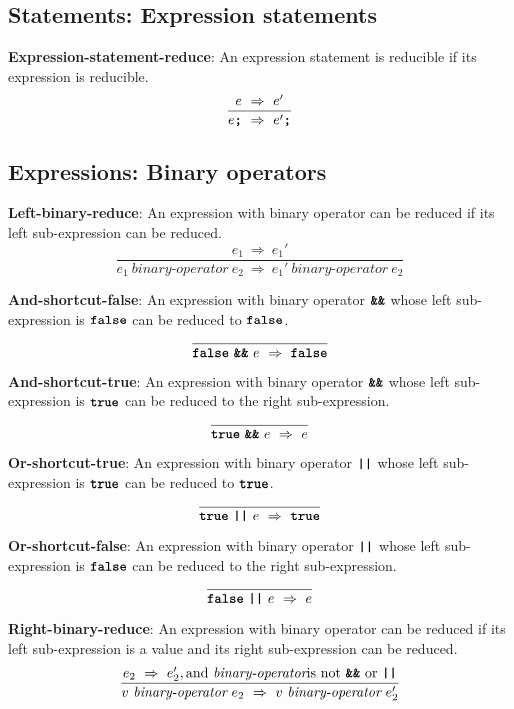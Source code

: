 \subsection*{Statements: Expression statements}

\textbf{Expression-statement-reduce}: An expression statement
is reducible if its expression is reducible.
\[
\frac{
  e\ \Rightarrow\ e'
}{  
  e \textbf{\texttt{;}}
  \ \Rightarrow \ 
  e' \textbf{\texttt{;}}
}
\]


\subsection*{Expressions: Binary operators}

\textbf{Left-binary-reduce}: An expression with binary operator
can be reduced if its left sub-expression can be reduced.
\[
\frac{
  e_1 \ \Rightarrow \ e_1'
}{
  e_1\  \textit{binary-operator} \ e_2
  \ \Rightarrow \ 
  e_1'\  \textit{binary-operator} \ e_2
}
\]


\vspace{10mm}
\textbf{And-shortcut-false}: An expression with binary operator
$\textbf{\texttt{\&\&}}$ whose left sub-expression is
$\textbf{\texttt{false}}$ can be reduced to
$\textbf{\texttt{false}}$.
\[
\frac{
}{
  \textbf{\texttt{false}}\  \textbf{\texttt{\&\&}}\ e
  \ \Rightarrow \ 
  \textbf{\texttt{false}}
}
\]

\vspace{10mm}
\textbf{And-shortcut-true}: An expression with binary operator
$\textbf{\texttt{\&\&}}$ whose left sub-expression is
$\textbf{\texttt{true}}$ can be reduced to
the right sub-expression.
\[
\frac{
}{
  \textbf{\texttt{true}}\  \textbf{\texttt{\&\&}}\ e
  \ \Rightarrow \ 
  e
}
\]

\vspace{10mm}
\textbf{Or-shortcut-true}: An expression with binary operator
$\textbf{\texttt{||}}$ whose left sub-expression is
$\textbf{\texttt{true}}$ can be reduced to
$\textbf{\texttt{true}}$.
\[
\frac{
}{
  \textbf{\texttt{true}}\  \textbf{\texttt{||}}\ e
  \ \Rightarrow \ 
  \textbf{\texttt{true}}
}
\]

\vspace{10mm}
\textbf{Or-shortcut-false}: An expression with binary operator
$\textbf{\texttt{||}}$ whose left sub-expression is
$\textbf{\texttt{false}}$ can be reduced to
the right sub-expression.
\[
\frac{
}{
  \textbf{\texttt{false}}\  \textbf{\texttt{||}}\ e
  \ \Rightarrow \ 
  e
}
\]

\vspace{10mm}
\textbf{Right-binary-reduce}: An expression with binary operator
can be reduced if its left sub-expression is a value and its right
sub-expression can be reduced.
\[
\frac{
  e_2\ \Rightarrow\ e_2', \textrm{and}\ \textit{binary-operator}
  \mbox{is not}\ \textbf{\texttt{\&\&}}\ \textrm{or}\ \texttt{\textbf{||}}
}{
  v\  \textit{binary-operator} \ e_2
  \ \Rightarrow \ 
  v\  \textit{binary-operator} \ e_2'
}
\]

